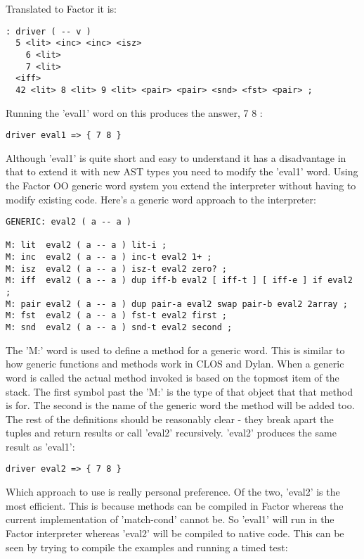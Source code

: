 Translated to Factor it is:

\begin{verbatim}
: driver ( -- v )
  5 <lit> <inc> <inc> <isz> 
    6 <lit>
    7 <lit>
  <iff> 
  42 <lit> 8 <lit> 9 <lit> <pair> <pair> <snd> <fst> <pair> ;
\end{verbatim}

Running the 'eval1' word on this produces the answer, { 7 8 }:

\begin{verbatim}
driver eval1 => { 7 8 }
\end{verbatim}

Although 'eval1' is quite short and easy to understand it has a
disadvantage in that to extend it with new AST types you need to
modify the 'eval1' word. Using the Factor OO generic word system you
extend the interpreter without having to modify existing code. Here's
a generic word approach to the interpreter:

\begin{verbatim}
GENERIC: eval2 ( a -- a )

M: lit  eval2 ( a -- a ) lit-i ;
M: inc  eval2 ( a -- a ) inc-t eval2 1+ ;
M: isz  eval2 ( a -- a ) isz-t eval2 zero? ;
M: iff  eval2 ( a -- a ) dup iff-b eval2 [ iff-t ] [ iff-e ] if eval2 ;
M: pair eval2 ( a -- a ) dup pair-a eval2 swap pair-b eval2 2array ;
M: fst  eval2 ( a -- a ) fst-t eval2 first ;
M: snd  eval2 ( a -- a ) snd-t eval2 second ;
\end{verbatim}

The 'M:' word is used to define a method for a generic word. This is
similar to how generic functions and methods work in CLOS and
Dylan. When a generic word is called the actual method invoked is
based on the topmost item of the stack. The first symbol past the 'M:'
is the type of that object that that method is for. The second is the
name of the generic word the method will be added too. The rest of the
definitions should be reasonably clear - they break apart the tuples
and return results or call 'eval2' recursively. 'eval2' produces the
same result as 'eval1':

\begin{verbatim}
driver eval2 => { 7 8 }
\end{verbatim}

Which approach to use is really personal preference. Of the two,
'eval2' is the most efficient. This is because methods can be compiled
in Factor whereas the current implementation of 'match-cond' cannot
be. So 'eval1' will run in the Factor interpreter whereas 'eval2' will
be compiled to native code. This can be seen by trying to compile the
examples and running a timed test:

